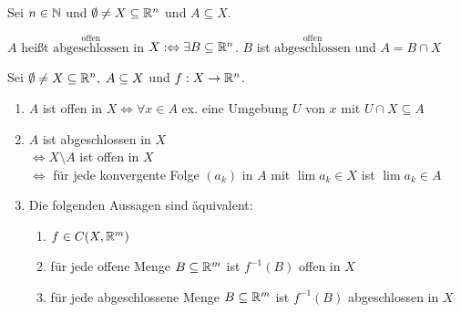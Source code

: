 \begin{definition}
    Sei $n \in \mathbb{N}$ und $\emptyset \neq X \subseteq \mathbb{R}^n$ und
    $A \subseteq X$.

    $A$ heißt $\stackrel{\text{offen}}{\text{abgeschlossen}}$ in
    $X :\Leftrightarrow \exists B \subseteq \mathbb{R}^n$.
    $B$ ist $\stackrel{\text{offen}}{\text{abgeschlossen}}$ und
    $A = B \cap X$
\end{definition}

\begin{satz}
    Sei $\emptyset \neq X \subseteq \mathbb{R}^n,\; A \subseteq X$ und
    $f: X \rightarrow \mathbb{R}^n$.

    \begin{enumerate}
        \item $A$ ist offen in $X \Leftrightarrow \forall x \in A$
              ex. eine Umgebung $U$ von $x$ mit $U \cap X \subseteq A$
        \item $A$ ist abgeschlossen in $X$\\
              $\Leftrightarrow X \setminus A$ ist offen in $X$\\
              $\Leftrightarrow$ für jede konvergente Folge $(a_k)$
              in $A$ mit $\lim a_k \in X$ ist $\lim a_k \in A$
        \item Die folgenden Aussagen sind äquivalent:
              \begin{enumerate}
                \item $f \in C(X, \mathbb{R}^m)$
                \item für jede offene Menge $B \subseteq \mathbb{R}^m$ ist
                      $f^{-1}(B)$ offen in $X$
                \item für jede abgeschlossene Menge $B \subseteq \mathbb{R}^m$ ist
                      $f^{-1}(B)$ abgeschlossen in $X$
              \end{enumerate}
    \end{enumerate}
\end{satz}
